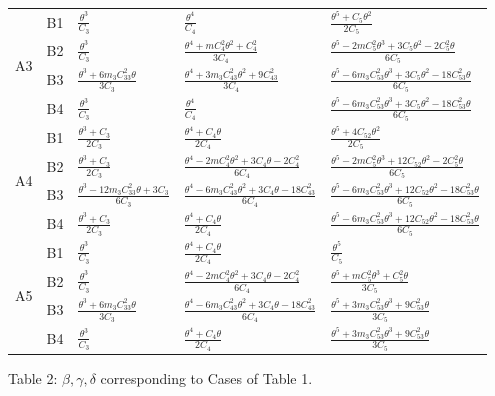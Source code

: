 \documentclass[table]{amsart}
\numberwithin{equation}{section}
\begin{document}
\begin{center}
\begin{longtable}[h!]{ |m{0.7cm}|m{0.7cm}|m{3.5cm}|m{4.7cm}|m{4.7cm}|}
\multirow{4}{*}{A3}& B1 &  $\frac{\theta^3}{C_3}$  &$\frac{\theta^4}{C_4}$ & $\frac{\theta^5+C_5\theta^2}{2C_5}$ \bigstrut \rule{0pt}{18pt} \\ \cline{2-5}
& B2 & $\frac{\theta^3}{C_3}$  & $\frac{\theta^4+mC_4^2\theta^2+C_4^2}{3C_4}$ & $\frac{\theta^5-2mC_5^2\theta^3+3C_5\theta^2-2C_5^2\theta}{6C_5}$\bigstrut \rule{0pt}{18pt} \\ \cline{2-5}
& B3 & $\frac{\theta^3+6m_3C_{33}^2\theta}{3C_3}$  & $\frac{\theta^4+3m_3C_{43}^2\theta^2+9C_{43}^2}{3C_4}$ & $\frac{\theta^5-6m_3C_{53}^2\theta^3+3C_5\theta^2-18C_{53}^2\theta}{6C_5}$ \bigstrut \rule{0pt}{18pt} \\ \cline{2-5}
& B4 &$\frac{\theta^3}{C_3}$  &$\frac{\theta^4}{C_4}$ &$\frac{\theta^5-6m_3C_{53}^2\theta^3+3C_5\theta^2-18C_{53}^2\theta}{6C_5}$ 
 \bigstrut \rule{0pt}{18pt} \\ \cline{1-5}
\hline
 \multirow{4}{*}{A4}& B1 & $\frac{\theta^3+C_3}{2C_3}$  &$\frac{\theta^4+C_4\theta}{2C_4}$ &$\frac{\theta^5+4C_{52}\theta^2}{2C_5}$ \bigstrut \rule{0pt}{18pt} \\ \cline{2-5}
& B2 & $\frac{\theta^3+C_3}{2C_3}$  &$\frac{\theta^4-2mC_4^2\theta^2+3C_4\theta-2C_4^2}{6C_4}$ &$\frac{\theta^5-2mC_5^2\theta^3+12C_{52}\theta^2-2C_5^2\theta}{6C_5}$ \bigstrut \rule{0pt}{18pt} \\ \cline{2-5}
& B3 &$\frac{\theta^3-12m_3C_{33}^2\theta+3C_3}{6C_3}$  &$\frac{\theta^4-6m_3C_{43}^2\theta^2+3C_4\theta-18C_{43}^2}{6C_4}$ & $\frac{\theta^5-6m_3C_{53}^2\theta^3+12C_{52}\theta^2-18C_{53}^2\theta}{6C_5}$\bigstrut \rule{0pt}{18pt} \\ \cline{2-5}
& B4 &$\frac{\theta^3+C_3}{2C_3}$  &$\frac{\theta^4+C_4\theta}{2C_4}$ &$\frac{\theta^5-6m_3C_{53}^2\theta^3+12C_{52}\theta^2-18C_{53}^2\theta}{6C_5}$ \bigstrut \rule{0pt}{18pt} \\ \cline{1-5}
 \multirow{4}{*}{A5}& B1 &$\frac{\theta^3}{C_3}$  &$\frac{\theta^4+C_4\theta}{2C_4}$ & $\frac{\theta^5}{C_5}$ \bigstrut \rule{0pt}{18pt}\\ \cline{2-5}
& B2 & $\frac{\theta^3}{C_3}$  &$\frac{\theta^4-2mC_4^2\theta^2+3C_4\theta-2C_4^2}{6C_4}$  & $\frac{\theta^5+mC_5^2\theta^3+C_5^2\theta}{3C_5}$ \bigstrut \rule{0pt}{18pt} \\ \cline{2-5}
& B3 & $\frac{\theta^3+6m_3C_{33}^2\theta}{3C_3}$ &$\frac{\theta^4-6m_3C_{43}^2\theta^2+3C_4\theta-18C_{43}^2}{6C_4}$ &$\frac{\theta^5+3m_3C_{53}^2\theta^3+9C_{53}^2\theta}{3C_5}$ \bigstrut \rule{0pt}{18pt} \\ \cline{2-5}
& B4 & $\frac{\theta^3}{C_3}$  &$\frac{\theta^4+C_4\theta}{2C_4}$ &$\frac{\theta^5+3m_3C_{53}^2\theta^3+9C_{53}^2\theta}{3C_5}$ \bigstrut \rule{0pt}{18pt} \\ \cline{1-5}
\end{longtable}
Table 2:  $\beta, \gamma, \delta$ corresponding to Cases of Table 1.
\end{center}
\end{document}
